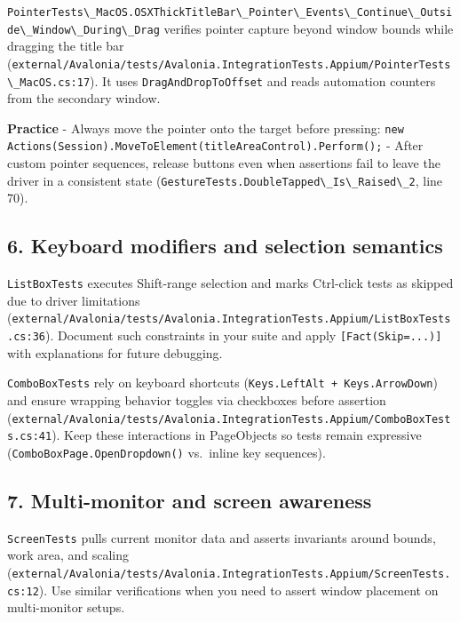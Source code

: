 \passthrough{\lstinline!PointerTests\_MacOS.OSXThickTitleBar\_Pointer\_Events\_Continue\_Outside\_Window\_During\_Drag!}
verifies pointer capture beyond window bounds while dragging the title
bar
(\passthrough{\lstinline!external/Avalonia/tests/Avalonia.IntegrationTests.Appium/PointerTests\_MacOS.cs:17!}).
It uses \passthrough{\lstinline!DragAndDropToOffset!} and reads
automation counters from the secondary window.

\textbf{Practice} - Always move the pointer onto the target before
pressing:
\passthrough{\lstinline!new Actions(Session).MoveToElement(titleAreaControl).Perform();!}
- After custom pointer sequences, release buttons even when assertions
fail to leave the driver in a consistent state
(\passthrough{\lstinline!GestureTests.DoubleTapped\_Is\_Raised\_2!},
line 70).

\subsection{6. Keyboard modifiers and selection
semantics}\label{keyboard-modifiers-and-selection-semantics}

\passthrough{\lstinline!ListBoxTests!} executes Shift-range selection
and marks Ctrl-click tests as skipped due to driver limitations
(\passthrough{\lstinline!external/Avalonia/tests/Avalonia.IntegrationTests.Appium/ListBoxTests.cs:36!}).
Document such constraints in your suite and apply
\passthrough{\lstinline![Fact(Skip=...)]!} with explanations for future
debugging.

\passthrough{\lstinline!ComboBoxTests!} rely on keyboard shortcuts
(\passthrough{\lstinline!Keys.LeftAlt + Keys.ArrowDown!}) and ensure
wrapping behavior toggles via checkboxes before assertion
(\passthrough{\lstinline!external/Avalonia/tests/Avalonia.IntegrationTests.Appium/ComboBoxTests.cs:41!}).
Keep these interactions in PageObjects so tests remain expressive
(\passthrough{\lstinline!ComboBoxPage.OpenDropdown()!} vs.~inline key
sequences).

\subsection{7. Multi-monitor and screen
awareness}\label{multi-monitor-and-screen-awareness}

\passthrough{\lstinline!ScreenTests!} pulls current monitor data and
asserts invariants around bounds, work area, and scaling
(\passthrough{\lstinline!external/Avalonia/tests/Avalonia.IntegrationTests.Appium/ScreenTests.cs:12!}).
Use similar verifications when you need to assert window placement on
multi-monitor setups.

